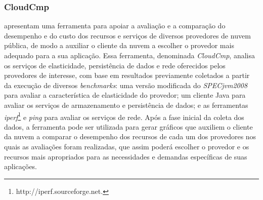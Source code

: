 

\subsubsection{CloudCmp}
 apresentam uma ferramenta para apoiar a avaliação e a comparação do
desempenho e do custo dos recursos e serviços de diversos provedores de nuvem
pública, de modo a auxiliar o cliente da nuvem a escolher o provedor mais adequado para a sua
aplicação. Essa ferramenta, denominada {\em CloudCmp}, analisa
os serviços de elasticidade, persistência de dados e rede oferecidos pelos provedores
de interesse, com base em resultados previamente coletados a partir da execução de diversos
{\em benchmarks}: uma versão modificada do {\em SPECjvm2008}~\cite{SPECjvm2008}
para avaliar a característica de elasticidade do provedor; um cliente Java para avaliar os serviços de
armazenamento e persistência de dados; e as ferramentas {\em iperf}\footnote{http://iperf.sourceforge.net. }
e {\em ping} para avaliar os serviços de rede. Após a fase inicial da coleta dos dados, a ferramenta pode ser utilizada para gerar gráficos que auxiliem o
cliente da nuvem a comparar o desempenho dos recursos de cada um
dos provedores nos quais as avaliações foram realizadas, que assim poderá escolher o provedor e os recursos mais apropriados para as necessidades e demandas específicas de suas aplicações. 



